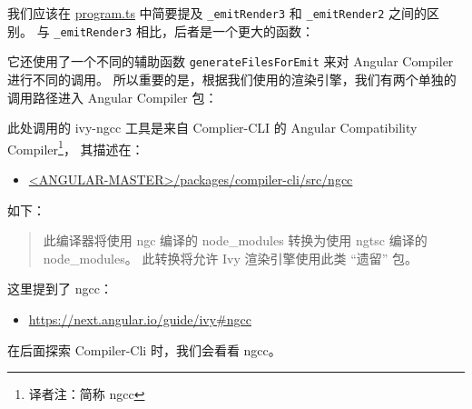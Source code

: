 
我们应该在
\href{https://github.com/angular/angular/blob/c8a1a14b87e5907458e8e87021e47f9796cb3257/packages/compiler-cli/src/transformers/program.ts}
{program.ts}
中简要提及 \texttt{\_emitRender3} 和 \texttt{\_emitRender2} 之间的区别。
与 \texttt{\_emitRender3} 相比，后者是一个更大的函数：




它还使用了一个不同的辅助函数 \texttt{generateFilesForEmit} 来对 Angular Compiler 进行不同的调用。
所以重要的是，根据我们使用的渲染引擎，我们有两个单独的调用路径进入 Angular Compiler 包：




此处调用的 ivy-ngcc 工具是来自 Complier-CLI 的 Angular Compatibility Compiler\footnote{译者注：简称 ngcc}，
其描述在：

\begin{itemize}
  \item \href{https://github.com/angular/angular/tree/master/packages/compiler-cli/src/ngcc}
        {<ANGULAR-MASTER>/packages/compiler-cli/src/ngcc}
\end{itemize}



如下：

\begin{quote}
  此编译器将使用 ngc 编译的 node\_modules 转换为使用 ngtsc 编译的 node\_modules。
  此转换将允许 Ivy 渲染引擎使用此类 “遗留” 包。
\end{quote}


这里提到了 ngcc：

\begin{itemize}
  \item \url{https://next.angular.io/guide/ivy#ngcc}
\end{itemize}


在后面探索 Compiler-Cli 时，我们会看看 ngcc。
